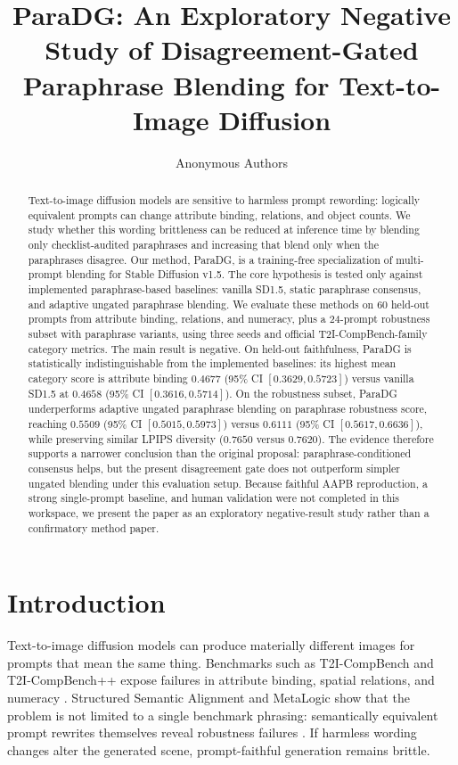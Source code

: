 \documentclass{article}
\title{\bf ParaDG: An Exploratory Negative Study of Disagreement-Gated Paraphrase Blending for Text-to-Image Diffusion}
\author{Anonymous Authors}
\date{}
\newcommand{\method}{ParaDG}
\begin{document}
\maketitle

\begin{abstract}
Text-to-image diffusion models are sensitive to harmless prompt rewording: logically equivalent prompts can change attribute binding, relations, and object counts. We study whether this wording brittleness can be reduced at inference time by blending only checklist-audited paraphrases and increasing that blend only when the paraphrases disagree. Our method, \method{}, is a training-free specialization of multi-prompt blending for Stable Diffusion v1.5. The core hypothesis is tested only against implemented paraphrase-based baselines: vanilla SD1.5, static paraphrase consensus, and adaptive ungated paraphrase blending. We evaluate these methods on 60 held-out prompts from attribute binding, relations, and numeracy, plus a 24-prompt robustness subset with paraphrase variants, using three seeds and official T2I-CompBench-family category metrics. The main result is negative. On held-out faithfulness, \method{} is statistically indistinguishable from the implemented baselines: its highest mean category score is attribute binding $0.4677$ (95\% CI $[0.3629, 0.5723]$) versus vanilla SD1.5 at $0.4658$ (95\% CI $[0.3616, 0.5714]$). On the robustness subset, \method{} underperforms adaptive ungated paraphrase blending on paraphrase robustness score, reaching $0.5509$ (95\% CI $[0.5015, 0.5973]$) versus $0.6111$ (95\% CI $[0.5617, 0.6636]$), while preserving similar LPIPS diversity ($0.7650$ versus $0.7620$). The evidence therefore supports a narrower conclusion than the original proposal: paraphrase-conditioned consensus helps, but the present disagreement gate does not outperform simpler ungated blending under this evaluation setup. Because faithful AAPB reproduction, a strong single-prompt baseline, and human validation were not completed in this workspace, we present the paper as an exploratory negative-result study rather than a confirmatory method paper.
\end{abstract}

\section{Introduction}
Text-to-image diffusion models can produce materially different images for prompts that mean the same thing. Benchmarks such as T2I-CompBench and T2I-CompBench++ expose failures in attribute binding, spatial relations, and numeracy \citep{huang2023t2icompbench,huang2025t2icompbenchpp}. Structured Semantic Alignment and MetaLogic show that the problem is not limited to a single benchmark phrasing: semantically equivalent prompt rewrites themselves reveal robustness failures \citep{feng2023ssa,shen2026metalogic}. If harmless wording changes alter the generated scene, prompt-faithful generation remains brittle.
\end{document}
